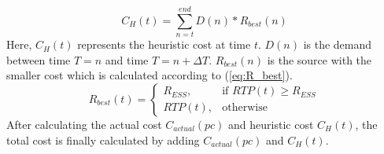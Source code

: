 \vspace{-1mm}
\begin{equation}
\label{eq:C_H}
C_H(t) = \sum_{n=t}^{end} D(n)*R_{best}(n)
\end{equation}
\vspace{-1mm}
Here, $C_H(t)$ represents the heuristic cost at time $t$. $D(n)$ is the demand between time $T = n$ and time $T = n+\Delta T$. $R_{best}(n)$ is the source with the smaller cost which is calculated according to (\ref{eq:R_best}).
\vspace{-1mm}
\begin{equation}
\label{eq:R_best}
R_{best}(t) = 
\begin{cases}
    R_{ESS},& \text{if } RTP(t)\geq R_{ESS}\\
    RTP(t),              & \text{otherwise}
\end{cases}
\end{equation}
\vspace{-1mm}
After calculating the actual cost  $C_{actual}(pc)$ and heuristic cost $C_H(t)$, the total cost is finally calculated by adding  $C_{actual}(pc)$ and $C_H(t)$. 






